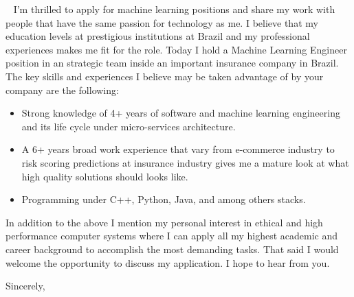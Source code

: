 \documentclass{scrlttr2}
\begin{document}
\begin{letter}{~ %
  }
  I’m thrilled to apply for machine learning positions and share my work with
  people that have the same passion for technology as me.  I believe that my
  education levels at prestigious institutions at Brazil and my professional
  experiences makes me fit for the role.  Today I hold a Machine Learning
  Engineer position in an strategic team inside an important insurance company
  in Brazil. The key skills and experiences I believe may be taken advantage of
  by your company are the following:

  \begin{itemize}
  \item Strong knowledge of 4+ years of software and machine learning
    engineering and its life cycle under micro-services architecture.
  \item A 6+ years broad work experience that vary from e-commerce industry to
    risk scoring predictions at insurance industry gives me a mature look at
    what high quality solutions should looks like.
  \item Programming under C++, Python, Java, and among others stacks.
  \end{itemize}

  In addition to the above I mention my personal interest in ethical and high
  performance computer systems where I can apply all my highest academic and
  career background to accomplish the most demanding tasks. That said I would
  welcome the opportunity to discuss my application. I hope to hear from you.

  \closing{Sincerely,}


\end{letter}
\end{document}
